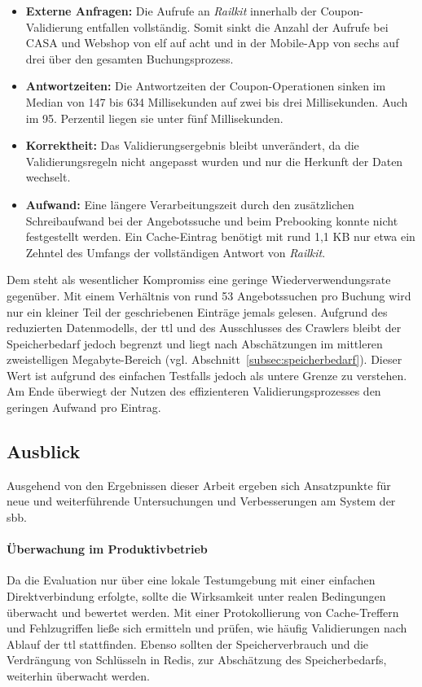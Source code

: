 \begin{itemize}
    \item \textbf{Externe Anfragen:} Die Aufrufe an \textit{Railkit} innerhalb der Coupon-Validierung entfallen vollständig. Somit sinkt die Anzahl der Aufrufe bei CASA und Webshop von elf auf acht und in der Mobile-App von sechs auf drei über den gesamten Buchungsprozess.
    \item \textbf{Antwortzeiten:} Die Antwortzeiten der Coupon-Operationen sinken im Median von 147 bis 634 Millisekunden auf zwei bis drei Millisekunden. Auch im 95. Perzentil liegen sie unter fünf Millisekunden.
    \item \textbf{Korrektheit:} Das Validierungsergebnis bleibt unverändert, da die Validierungsregeln nicht angepasst wurden und nur die Herkunft der Daten wechselt.
    \item \textbf{Aufwand:} Eine längere Verarbeitungszeit durch den zusätzlichen Schreibaufwand bei der Angebotssuche und beim Prebooking konnte nicht festgestellt werden. Ein Cache-Eintrag benötigt mit rund 1,1 KB nur etwa ein Zehntel des Umfangs der vollständigen Antwort von \textit{Railkit}.
\end{itemize}

Dem steht als wesentlicher Kompromiss eine geringe Wiederverwendungsrate gegenüber. Mit einem Verhältnis von rund 53 Angebotssuchen pro Buchung wird nur ein kleiner Teil der geschriebenen Einträge jemals gelesen. Aufgrund des reduzierten Datenmodells, der \ac{ttl} und des Ausschlusses des Crawlers bleibt der Speicherbedarf jedoch begrenzt und liegt nach Abschätzungen im mittleren zweistelligen Megabyte-Bereich (vgl. Abschnitt~\ref{subsec:speicherbedarf}). Dieser Wert ist aufgrund des einfachen Testfalls jedoch als untere Grenze zu verstehen. Am Ende überwiegt der Nutzen des effizienteren Validierungsprozesses den geringen Aufwand pro Eintrag.

\subsection{Ausblick}
\label{subsec:ausblick}

Ausgehend von den Ergebnissen dieser Arbeit ergeben sich Ansatzpunkte für neue und weiterführende Untersuchungen und Verbesserungen am System der \ac{sbb}.

\paragraph{Überwachung im Produktivbetrieb}
Da die Evaluation nur über eine lokale Testumgebung mit einer einfachen Direktverbindung erfolgte, sollte die Wirksamkeit unter realen Bedingungen überwacht und bewertet werden. Mit einer Protokollierung von Cache-Treffern und Fehlzugriffen ließe sich ermitteln und prüfen, wie häufig Validierungen nach Ablauf der \ac{ttl} stattfinden. Ebenso sollten der Speicherverbrauch und die Verdrängung von Schlüsseln in Redis, zur Abschätzung des Speicherbedarfs, weiterhin überwacht werden.



